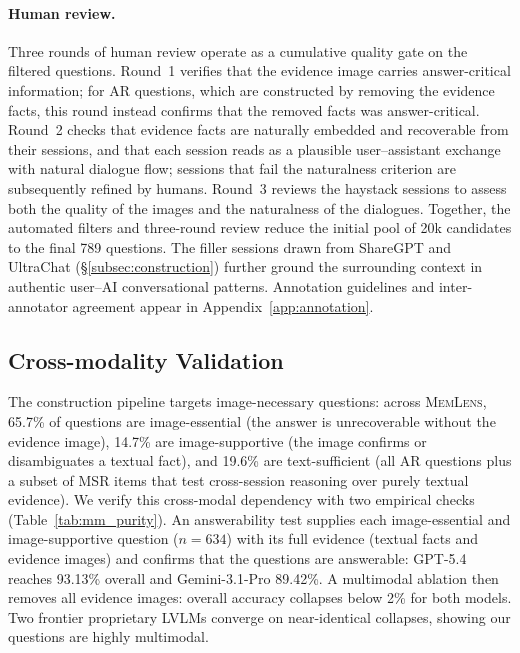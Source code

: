 \documentclass{article}
\newcommand{\bench}{\textsc{MemLens}}
\begin{document}
\paragraph{Human review.}
Three rounds of human review operate as a cumulative quality gate on the filtered questions. Round~1 verifies that the evidence image carries answer-critical information; for AR questions, which are constructed by removing the evidence facts, this round instead confirms that the removed facts was answer-critical. Round~2 checks that evidence facts are naturally embedded and recoverable from their sessions, and that each session reads as a plausible user--assistant exchange with natural dialogue flow; sessions that fail the naturalness criterion are subsequently refined by humans. Round~3 reviews the haystack sessions to assess both the quality of the images and the naturalness of the dialogues. Together, the automated filters and three-round review reduce the initial pool of 20k candidates to the final 789 questions. The filler sessions drawn from ShareGPT and UltraChat (\S\ref{subsec:construction}) further ground the surrounding context in authentic user--AI conversational patterns. Annotation guidelines and inter-annotator agreement appear in Appendix~\ref{app:annotation}.

\subsection{Cross-modality Validation}
\label{subsec:cross_modality}
The construction pipeline targets image-necessary questions: across \bench{}, 65.7\% of questions are image-essential (the answer is unrecoverable without the evidence image), 14.7\% are image-supportive (the image confirms or disambiguates a textual fact), and 19.6\% are text-sufficient (all AR questions plus a subset of MSR items that test cross-session reasoning over purely textual evidence). We verify this cross-modal dependency with two empirical checks (Table~\ref{tab:mm_purity}). An answerability test supplies each image-essential and image-supportive question ($n = 634$) with its full evidence (textual facts and evidence images) and confirms that the questions are answerable: GPT-5.4 reaches 93.13\% overall and Gemini-3.1-Pro 89.42\%. A multimodal ablation then removes all evidence images: overall accuracy collapses below 2\% for both models. Two frontier proprietary LVLMs converge on near-identical collapses, showing our questions are highly multimodal.
\end{document}
